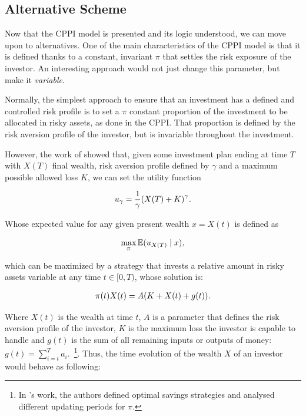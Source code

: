 \subsection{Alternative Scheme}

Now that the CPPI model is presented and its logic understood, we can move upon to alternatives. One of the main characteristics of the CPPI model is that it is defined thanks to a constant, invariant $\pi$ that settles the risk exposure of the investor. An interesting approach would not just change this parameter, but make it \emph{variable}.

Normally, the simplest approach to ensure that an investment has a defined and controlled risk profile is to set a $\pi$ constant proportion of the investment to be allocated in risky assets, as done in the CPPI. That proportion is defined by the risk aversion profile of the investor, but is invariable throughout the investment.

However, the work of \cite{a:guillen-optimisation} showed that, given some investment plan ending at time $T$ with $X(T)$ final wealth, risk aversion profile defined by $\gamma$ and a maximum possible allowed loss $K$, we can set the utility function

\begin{align}
    u_\gamma = \frac{1}{\gamma}\qty(X(T) + K)^\gamma \emph{.}
\end{align}

Whose expected value for any given present wealth $x = X(t)$ is defined as

\begin{align}\label{eq:maxE}
    \max_{\pi}\EX\giventhat{u_{X(T)}}{x} \emph{,}
\end{align}

which can be maximized by a strategy that invests a relative amount in risky assets variable at any time $t \in [0,T)$, whose solution is:

\begin{align}\label{eq:the_formula}
    \pi(t)X(t) = A\qty(K + X(t) + g(t)) \textit{.}
\end{align}

Where $X(t)$ is the wealth at time $t$, $A$ is a parameter that defines the risk aversion profile of the investor, $K$ is the maximum loss the investor is capable to handle and $g(t)$ is the sum of all remaining inputs or outputs of money: $g(t) = \sum_{i=t}^{T}a_i$.~\footnote{In \cite{a:donnelly-savings-decisions}'s work, the authors defined optimal savings strategies and analysed different updating periods for $\pi$.}. Thus, the time evolution of the wealth $X$ of an investor would behave as following:

